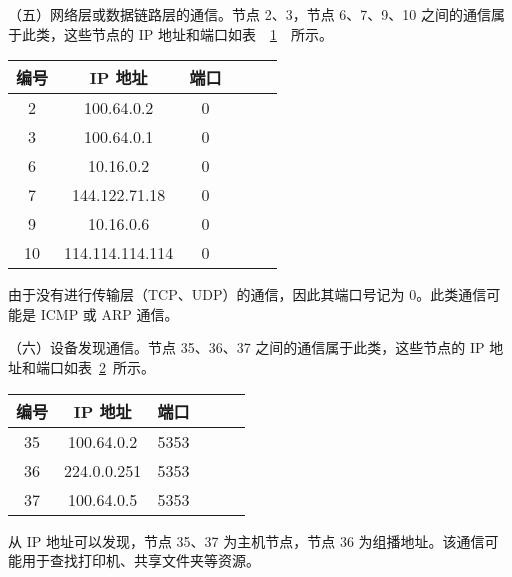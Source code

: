 {（五）网络层或数据链路层的通信。节点 2、3，节点 6、7、9、10 之间的通信属于此类，这些节点的 IP 地址和端口如表~~\ref{tab:benign-structure-5}~~所示。

\begin{table}[!htbp]
    \label{tab:benign-structure-5}
    \centering
    \footnotesize%
    \setlength{\tabcolsep}{4pt}%
    \renewcommand{\arraystretch}{1.2}%
    \begin{tabular}{cccccc}
        \hline
        编号 & IP 地址 & 端口\\
        \hline
        2 & 100.64.0.2 & 0\\
        3 & 100.64.0.1 & 0\\
        6 & 10.16.0.2 & 0\\
        7 & 144.122.71.18 & 0\\
        9 & 10.16.0.6 & 0\\
        10 & 114.114.114.114 & 0\\
        \hline
    \end{tabular}
\end{table}

由于没有进行传输层（TCP、UDP）的通信，因此其端口号记为 0。此类通信可能是 ICMP 或 ARP 通信。

（六）设备发现通信。节点 35、36、37 之间的通信属于此类，这些节点的 IP 地址和端口如表~\ref{tab:benign-structure-6}~所示。

\begin{table}[!htbp]
    \label{tab:benign-structure-6}
    \centering
    \footnotesize%
    \setlength{\tabcolsep}{4pt}%
    \renewcommand{\arraystretch}{1.2}%
    \begin{tabular}{cccccc}
        \hline
        编号 & IP 地址 & 端口\\
        \hline
        35 & 100.64.0.2 & 5353\\
        36 & 224.0.0.251 & 5353\\
        37 & 100.64.0.5 & 5353\\
        \hline
    \end{tabular}
\end{table}

从 IP 地址可以发现，节点 35、37 为主机节点，节点 36 为组播地址。该通信可能用于查找打印机、共享文件夹等资源。

}
